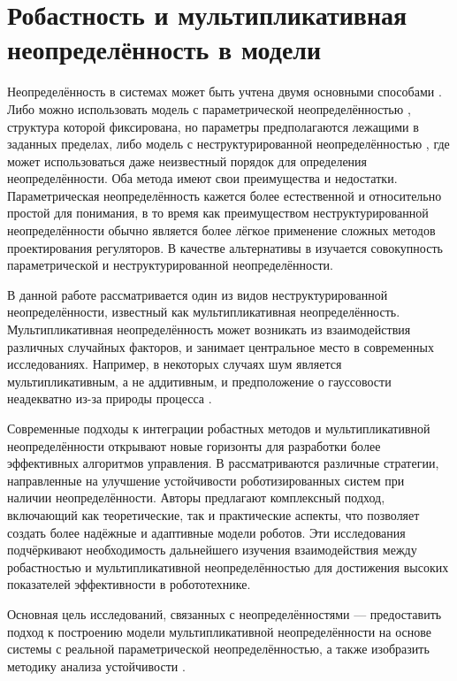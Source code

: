 \section{Робастность и мультипликативная неопределённость в модели}\label{sec:ch1/sec5}

Неопределённость в системах может быть учтена двумя основными способами \cite{Radek2017}. Либо можно использовать модель с параметрической неопределённостью \cite{barmish1994new, Bhattacharyya2009}, структура которой фиксирована, но параметры предполагаются лежащими в заданных пределах, либо модель с неструктурированной неопределённостью \cite{Doyle2009, Kucera2007}, где может использоваться даже неизвестный порядок для определения неопределённости. Оба метода имеют свои преимущества и недостатки. Параметрическая неопределённость кажется более естественной и относительно простой для понимания, в то время как преимуществом неструктурированной неопределённости обычно является более лёгкое применение сложных методов проектирования регуляторов. В качестве альтернативы в \cite{Tan2003} изучается совокупность параметрической и неструктурированной неопределённости.

В данной работе рассматривается один из видов неструктурированной неопределённости, известный как мультипликативная неопределённость. Мультипликативная неопределённость может возникать из взаимодействия различных случайных факторов, и занимает центральное место в современных исследованиях. Например, в некоторых случаях шум является мультипликативным, а не аддитивным, и предположение о гауссовости неадекватно из-за природы процесса \cite{Bosse2016, Panza2015}.

Современные подходы к интеграции робастных методов и мультипликативной неопределённости открывают новые горизонты для разработки более эффективных алгоритмов управления. В \cite{Radek2017} рассматриваются различные стратегии, направленные на улучшение устойчивости роботизированных систем при наличии неопределённости. Авторы предлагают комплексный подход, включающий как теоретические, так и практические аспекты, что позволяет создать более надёжные и адаптивные модели роботов. Эти исследования подчёркивают необходимость дальнейшего изучения взаимодействия между робастностью и мультипликативной неопределённостью для достижения высоких показателей эффективности в робототехнике.

Основная цель исследований, связанных с неопределённостями --- предоставить подход к построению модели мультипликативной неопределённости на основе системы с реальной параметрической неопределённостью, а также изобразить методику анализа устойчивости \cite{Skogestad2005}.

